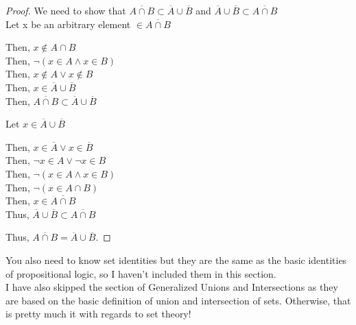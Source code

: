 \begin{proof}
    We need to show that $\overline{A \cap B} \subset \overline{A} \cup
    \overline{B}$ and $\overline{A} \cup \overline{B} \subset \overline{A \cap
    B}$ \\
    Let x be an arbitrary element $\in \overline{A \cap B}$
    \begin{center}
        Then, $x \not\in A \cap B$ \\
        Then, $\neg(x \in A \wedge x \in B)$ \\
        Then, $x \not\in A \vee x \not\in B$ \\
        Then, $x \in \overline{A} \cup \overline{B}$ \\
        Then, $\overline{A \cap B} \subset \overline{A} \cup \overline{B}$
    \end{center}
    Let $x \in \overline{A} \cup \overline{B}$
    \begin{center}
        Then, $x \in \overline{A} \vee x \in \overline{B}$ \\
        Then, $\neg x \in A \vee \neg x \in B$ \\
        Then, $\neg (x \in A \wedge x \in B)$ \\
        Then, $\neg (x \in A \cap B)$ \\
        Then, $x \in \overline{A \cap B}$ \\
        Thus, $\overline{A} \cup \overline{B} \subset \overline{A \cap B}$
    \end{center}
    Thus, $\overline{A \cap B} = \overline{A} \cup \overline{B}$.
\end{proof}
You also need to know set identities but they are the same as the basic
identities of propositional logic, so I haven't included them in this section.
\\

I have also skipped the section of Generalized Unions and Intersections as they
are based on the basic definition of union and intersection of sets. Otherwise,
that is pretty much it with regards to set theory!
